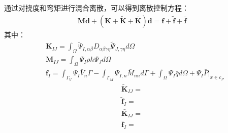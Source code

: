 \documentclass[a4paper]{article}
\begin{document}
通过对挠度和弯矩进行混合离散，可以得到离散控制方程：
\begin{equation}
\begin{split}
    \pmb{M}\ddot{\pmb d}+(\pmb{K}+\pmb{\tilde{K}}+\pmb{\bar{K}})\pmb{d}=\pmb{f}+\pmb{\tilde{f}}+\pmb{\bar f}
\end{split}
\end{equation}
其中：
\begin{equation}
\begin{split}
    &\pmb{K}_{I\!J}=\int_{\Omega}\tilde{\Psi}_{I,\alpha\beta}D_{\alpha\beta\gamma\eta}\tilde{\Psi}_{J,\gamma\eta}d\Omega\\
    &\pmb{M}_{I\!J}=\int_{\Omega}\Psi_I\rho h\Psi_Jd\Omega\\
    &\pmb{f}_I=\int_{\Gamma_V}\Psi_I\bar{V}_n\Gamma-\int_{\Gamma_M}\Psi_{I,n}\bar{M}_{nn}d\Gamma+\int_{\Omega}\Psi_I\bar{q}d\Omega+\Psi_I\bar{P}\vert_{x\in c_P}
\end{split}
\end{equation}
\begin{equation}
\begin{split}
   \pmb{\tilde{K}}_{I\!J}=\\
   \pmb{\tilde{f}}_I= 
\end{split}
\end{equation}
\begin{equation}
\begin{split}
     \pmb{\bar{K}}_{I\!J}=\\
     \pmb{\bar{f}}_I=
\end{split}
\end{equation}
\end{document}
